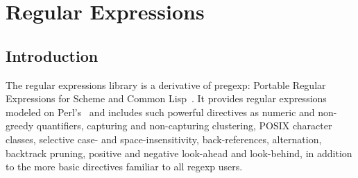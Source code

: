 


%
%

\chapter {Regular Expressions}\label{chap:pregexp}

\section {Introduction}

The regular expressions library  is a derivative
of pregexp: Portable Regular Expressions for Scheme and Common
Lisp~\cite{pregexp}. It provides regular expressions modeled on
Perl's~\cite{friedl:regex,pperl} and includes such powerful directives
as numeric and non-greedy quantifiers, capturing and non-capturing
clustering, POSIX character classes, selective case- and
space-insensitivity, back-references, alternation, backtrack pruning,
positive and negative look-ahead and look-behind, in addition to the
more basic directives familiar to all regexp users.


